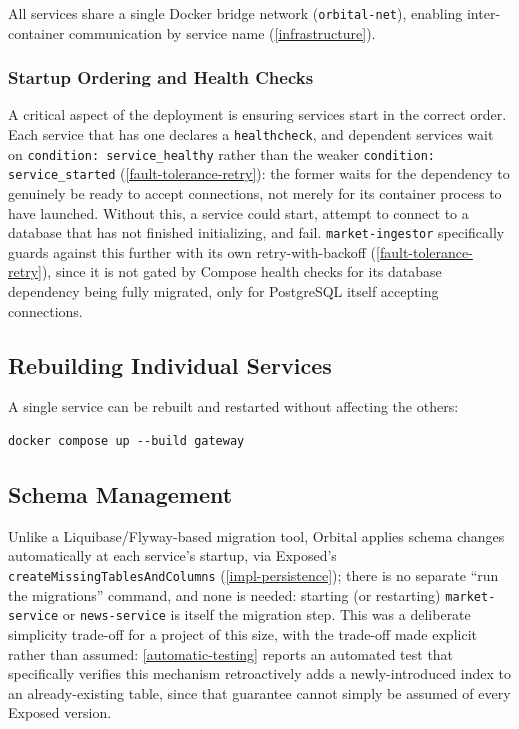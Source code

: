 \documentclass{scrartcl}
\begin{document}
All services share a single Docker bridge network (\texttt{orbital-net}), enabling inter-container
communication by service name (\cref{infrastructure}).

\subsubsection{Startup Ordering and Health Checks}\label{deployment-health}

A critical aspect of the deployment is ensuring services start in the correct order. Each service
that has one declares a \texttt{healthcheck}, and dependent services wait on \texttt{condition:
service\_healthy} rather than the weaker \texttt{condition: service\_started}
(\cref{fault-tolerance-retry}): the former waits for the dependency to genuinely be ready to
accept connections, not merely for its container process to have launched. Without this, a
service could start, attempt to connect to a database that has not finished initializing, and
fail. \texttt{market-ingestor} specifically guards against this further with its own
retry-with-backoff (\cref{fault-tolerance-retry}), since it is not gated by Compose health checks
for its database dependency being fully migrated, only for PostgreSQL itself accepting
connections.

\subsection{Rebuilding Individual Services}\label{deployment-rebuild}

A single service can be rebuilt and restarted without affecting the others:
\begin{verbatim}
docker compose up --build gateway
\end{verbatim}

\subsection{Schema Management}\label{deployment-schema}

Unlike a Liquibase/Flyway-based migration tool, Orbital applies schema changes automatically at
each service's startup, via Exposed's \texttt{createMissingTablesAndColumns}
(\cref{impl-persistence}); there is no separate ``run the migrations'' command, and none is
needed: starting (or restarting) \texttt{market-service} or \texttt{news-service} is itself the
migration step. This was a deliberate simplicity trade-off for a project of this size, with the
trade-off made explicit rather than assumed: \cref{automatic-testing} reports an automated test
that specifically verifies this mechanism retroactively adds a newly-introduced index to an
already-existing table, since that guarantee cannot simply be assumed of every Exposed version.
\end{document}
